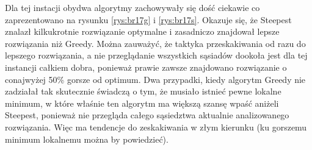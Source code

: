 Dla tej instacji obydwa algorytmy zachowywały się dość ciekawie co zaprezentowano na rysunku \ref{rys:br17g} i \ref{rys:br17s}. Okazuje się, że Steepest znalazł kilkukrotnie rozwiązanie optymalne i zasadniczo znajdował lepsze rozwiązania niż Greedy. Można zauważyć, że taktyka przeskakiwania od razu do lepszego rozwiązania, a nie przeglądanie wszystkich sąsiadów dookoła jest dla tej instancji całkiem dobra, ponieważ prawie zawsze znajdowano rozwiązanie o conajwyżej 50\% gorsze od optimum. Dwa przypadki, kiedy algorytm Greedy nie zadziałał tak skutecznie świadczą o tym, że musiało istnieć pewne lokalne minimum, w które właśnie ten algorytm ma większą szansę wpaść aniżeli Steepest, ponieważ nie przegląda całego sąsiedztwa aktualnie analizowanego rozwiązania. Więc ma tendencje do zeskakiwania w złym kierunku (ku gorszemu minimum lokalnemu można by powiedzieć).

